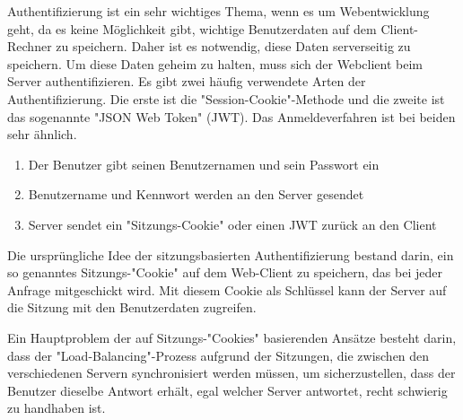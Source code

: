 

Authentifizierung ist ein sehr wichtiges Thema, wenn es um Webentwicklung geht, da es keine Möglichkeit gibt, wichtige Benutzerdaten auf dem Client-Rechner zu speichern. Daher ist es notwendig, diese Daten serverseitig zu speichern. Um diese Daten geheim zu halten, muss sich der Webclient beim Server authentifizieren. Es gibt zwei häufig verwendete Arten der Authentifizierung. Die erste ist die "Session-Cookie"-Methode und die zweite ist das sogenannte "JSON Web Token" (JWT). Das Anmeldeverfahren ist bei beiden sehr ähnlich. 

\begin{enumerate}
    \item Der Benutzer gibt seinen Benutzernamen und sein Passwort ein
    \item Benutzername und Kennwort werden an den Server gesendet
    \item Server sendet ein "Sitzungs-Cookie" oder einen JWT zurück an den Client
\end{enumerate}


Die ursprüngliche Idee der sitzungsbasierten Authentifizierung bestand darin, ein so genanntes Sitzungs-"Cookie" auf dem Web-Client zu speichern, das bei jeder Anfrage mitgeschickt wird. Mit diesem Cookie als Schlüssel kann der Server auf die Sitzung mit den Benutzerdaten zugreifen. 

Ein Hauptproblem der auf Sitzungs-"Cookies" basierenden Ansätze besteht darin, dass der "Load-Balancing"-Prozess aufgrund der Sitzungen, die zwischen den verschiedenen Servern synchronisiert werden müssen, um sicherzustellen, dass der Benutzer dieselbe Antwort erhält, egal welcher Server antwortet, recht schwierig zu handhaben ist.



